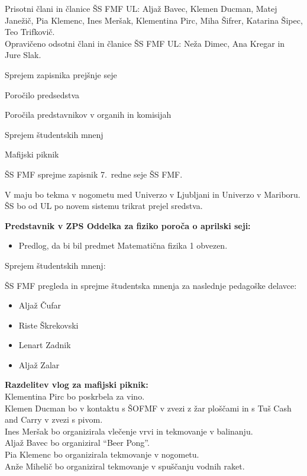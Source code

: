 \documentclass{seja}
\begin{document}
Prisotni člani in članice ŠS FMF UL:
Aljaž Bavec,
Klemen Ducman,
Matej Janežič,
Pia Klemenc,
Ines Meršak,
Klementina Pirc,
Miha Šifrer,
Katarina Šipec,
Teo Trifkovič.
\\
Opravičeno odsotni člani in članice ŠS FMF UL:
Neža Dimec, Ana Kregar in Jure Slak.

\begin{red}
  \item Sprejem zapisnika prejšnje seje
  \item Poročilo predsedstva
  \item Poročila predstavnikov v organih in komisijah
  \item Sprejem študentskih mnenj
  \item Mafijski piknik
\end{red}

\begin{ad}
	\item 
	 ŠS FMF sprejme zapisnik 7.~redne seje ŠS FMF.
	
	\item 
	V maju bo tekma v nogometu med Univerzo v Ljubljani in Univerzo v Mariboru. \\
	ŠS bo od UL po novem sistemu trikrat prejel sredstva.	
	
	\item 
	\textbf{Predstavnik v ZPS Oddelka za fiziko poroča o aprilski seji:}
	\begin{itemize}
		\item Predlog, da bi bil predmet Matematična fizika 1 obvezen.
	\end{itemize}
	\item
	Sprejem študentskih mnenj:
	\begin{sklep}
		ŠS FMF pregleda in sprejme študentska mnenja za naslednje pedagoške delavce:
		\begin{itemize}
			\item Aljaž Čufar
			\item Riste Škrekovski
			\item Lenart Zadnik
			\item Aljaž Zalar
		\end{itemize}	
	\end{sklep} 
	
	\item
	\textbf{Razdelitev vlog za mafijski piknik:} \\
	Klementina Pirc bo poskrbela za vino.\\
	Klemen Ducman bo v kontaktu s ŠOFMF v zvezi z žar ploščami in s Tuš Cash and Carry v zvezi s pivom. \\
	Ines Meršak bo organizirala vlečenje vrvi in tekmovanje v balinanju. \\
	Aljaž Bavec bo organiziral ``Beer Pong''. \\
	Pia Klemenc bo organizirala tekmovanje v nogometu. \\
	Anže Mihelič bo organiziral tekmovanje v spuščanju vodnih raket.
\end{ad}
\end{document}

